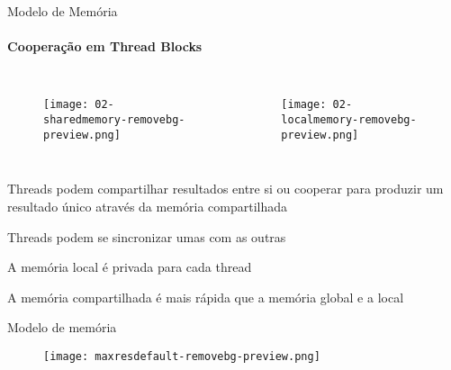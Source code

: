 \begin{frame}[t]{Modelo de Memória}
    \framesubtitle{Cooperação em Thread Blocks}
    \begin{columns}
            \begin{figure}
               \texttt{[image: 02-sharedmemory-removebg-preview.png]}
            \end{figure}
        
            \begin{figure}
               \texttt{[image: 02-localmemory-removebg-preview.png]}
            \end{figure}
    \end{columns}
    \vspace*{0.2cm}
    \itemize
    \item Threads podem compartilhar resultados entre si ou cooperar para produzir um resultado único através da memória compartilhada
    \item Threads podem se sincronizar umas com as outras
    \item A memória local é privada para cada thread
    \item A memória compartilhada é mais rápida que a memória global e a local

\end{frame}
\begin{frame}[t]{Modelo de memória}
    \begin{figure}
        \texttt{[image: maxresdefault-removebg-preview.png]}
    \end{figure}

\end{frame}
